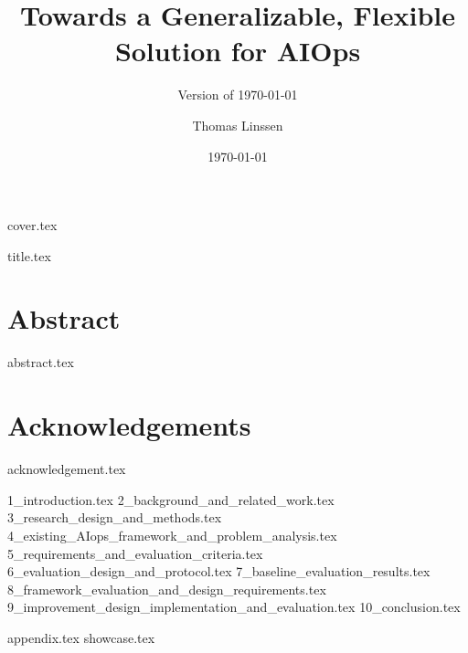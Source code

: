 \documentclass[oneside,openany]{mscthesis}
\title{Towards a Generalizable, Flexible Solution for AIOps\\}
\subtitle{Version of \today}
\date{\today}
\author{Thomas Linssen}
\begin{document}
%
%

\frontmatter
{cover.tex}

\cleartorecto{}
{title.tex}


\cleartorecto{}
\chapter{Abstract}
{abstract.tex}
\glsresetall{}

\cleartorecto{}
\tableofcontents{}
\clearpage{}

\listoffigures{}
\clearpage{}

\listoftables{}
\clearpage{}

\cleartorecto{}
\chapter{Acknowledgements}
{acknowledgement.tex}


\mainmatter

{1_introduction.tex}
{2_background_and_related_work.tex}
{3_research_design_and_methods.tex}
{4_existing_AIops_framework_and_problem_analysis.tex}
{5_requirements_and_evaluation_criteria.tex}
{6_evaluation_design_and_protocol.tex}
{7_baseline_evaluation_results.tex}
{8_framework_evaluation_and_design_requirements.tex}
{9_improvement_design_implementation_and_evaluation.tex}
{10_conclusion.tex}

%
%

\appendix

{appendix.tex}
{showcase.tex}

%
%

\backmatter

\printbibliography{}
\cleardoublepage{}

\printacronyms[style=long,title={Acronyms}]
\cleardoublepage{}

\end{document}
